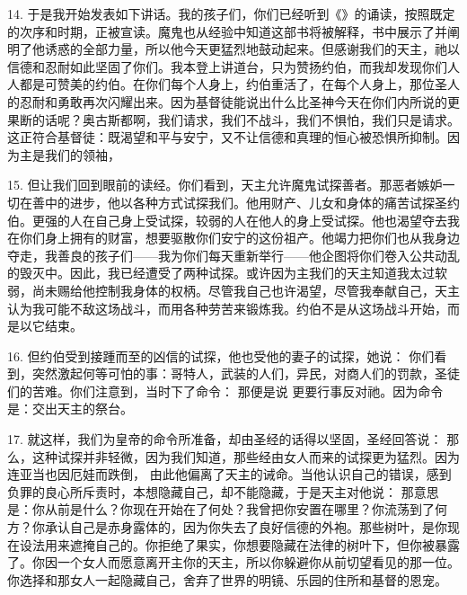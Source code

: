 14. 于是我开始发表如下讲话。我的孩子们，你们已经听到《》的诵读，按照既定的次序和时期，正被宣读。魔鬼也从经验中知道这部书将被解释，书中展示了并阐明了他诱惑的全部力量，所以他今天更猛烈地鼓动起来。但感谢我们的天主，祂以信德和忍耐如此坚固了你们。我本登上讲道台，只为赞扬约伯，而我却发现你们人人都是可赞美的约伯。在你们每个人身上，约伯重活了，在每个人身上，那位圣人的忍耐和勇敢再次闪耀出来。因为基督徒能说出什么比圣神今天在你们内所说的更果断的话呢？奥古斯都啊，我们请求，我们不战斗，我们不惧怕，我们只是请求。这正符合基督徒：既渴望和平与安宁，又不让信德和真理的恒心被恐惧所抑制。因为主是我们的领袖，\par

15. 但让我们回到眼前的读经。你们看到，天主允许魔鬼试探善者。那恶者嫉妒一切在善中的进步，他以各种方式试探我们。他用财产、儿女和身体的痛苦试探圣约伯。更强的人在自己身上受试探，较弱的人在他人的身上受试探。他也渴望夺去我在你们身上拥有的财富，想要驱散你们安宁的这份祖产。他竭力把你们也从我身边夺走，我善良的孩子们——我为你们每天重新举行——他企图将你们卷入公共动乱的毁灭中。因此，我已经遭受了两种试探。或许因为主我们的天主知道我太过软弱，尚未赐给他控制我身体的权柄。尽管我自己也许渴望，尽管我奉献自己，天主认为我可能不敌这场战斗，而用各种劳苦来锻炼我。约伯不是从这场战斗开始，而是以它结束。\par

16. 但约伯受到接踵而至的凶信的试探，他也受他的妻子的试探，她说： 你们看到，突然激起何等可怕的事：哥特人，武装的人们，异民，对商人们的罚款，圣徒们的苦难。你们注意到，当时下了命令： 那便是说  更要行事反对祂。因为命令是：交出天主的祭台。\par

17. 就这样，我们为皇帝的命令所准备，却由圣经的话得以坚固，圣经回答说： 那么，这种试探并非轻微，因为我们知道，那些经由女人而来的试探更为猛烈。因为连亚当也因厄娃而跌倒， 由此他偏离了天主的诫命。当他认识自己的错误，感到负罪的良心所斥责时，本想隐藏自己，却不能隐藏，于是天主对他说： 那意思是：你从前是什么？你现在开始在了何处？我曾把你安置在哪里？你流荡到了何方？你承认自己是赤身露体的，因为你失去了良好信德的外袍。那些树叶，是你现在设法用来遮掩自己的。你拒绝了果实，你想要隐藏在法律的树叶下，但你被暴露了。你因一个女人而愿意离开主你的天主，所以你躲避你从前切望看见的那一位。你选择和那女人一起隐藏自己，舍弃了世界的明镜、乐园的住所和基督的恩宠。\par

